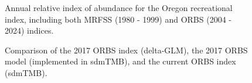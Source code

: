 \documentclass[
]{scrartcl}
\begin{document}
\begin{figure}


\caption{\label{fig-ORBS_index}Annual relative index of abundance for
the Oregon recreational index, including both MRFSS (1980 - 1999) and
ORBS (2004 - 2024) indices.}

\end{figure}%

\clearpage

\begin{figure}


\caption{\label{fig-ORBS_comp}Comparison of the 2017 ORBS index
(delta-GLM), the 2017 ORBS model (implemented in sdmTMB), and the
current ORBS index (sdmTMB).}

\end{figure}%
\end{document}

